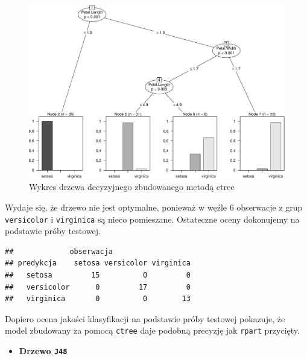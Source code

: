 \documentclass[
]{book}
\newenvironment{Shaded}{\begin{snugshade}}{\end{snugshade}}
\newcommand{\DataTypeTok}[1]{\textcolor[rgb]{0.13,0.29,0.53}{#1}}
\newcommand{\KeywordTok}[1]{\textcolor[rgb]{0.13,0.29,0.53}{\textbf{#1}}}
\newcommand{\NormalTok}[1]{#1}
\newcommand{\OperatorTok}[1]{\textcolor[rgb]{0.81,0.36,0.00}{\textbf{#1}}}
\newcommand{\StringTok}[1]{\textcolor[rgb]{0.31,0.60,0.02}{#1}}
\providecommand{\tightlist}{%
  \setlength{\itemsep}{0pt}\setlength{\parskip}{0pt}}
\theoremstyle{plain}
\theoremstyle{definition}
\theoremstyle{definition}
\theoremstyle{definition}
\theoremstyle{definition}
\theoremstyle{remark}
\begin{document}
\begin{figure}
\centering
\includegraphics{EksploracjaDanych_files/figure-latex/ctree-1.pdf}
\caption{\label{fig:ctree}Wykres drzewa decyzyjnego zbudowanego metodą ctree}
\end{figure}

Wydaje się, że drzewo nie jest optymalne, ponieważ w węźle 6 obserwacje z grup \texttt{versicolor} i \texttt{virginica} są nieco pomieszane. Ostateczne oceny dokonujemy na podstawie próby testowej.

\begin{Shaded}
\end{Shaded}

\begin{verbatim}
##             obserwacja
## predykcja    setosa versicolor virginica
##   setosa         15          0         0
##   versicolor      0         17         0
##   virginica       0          0        13
\end{verbatim}

Dopiero ocena jakości klasyfikacji na podstawie próby testowej pokazuje, że model zbudowany za pomocą \texttt{ctree} daje podobną precyzję jak \texttt{rpart} przycięty.

\begin{itemize}
\tightlist
\item
  \textbf{Drzewo \texttt{J48}}
\end{itemize}
\end{document}
